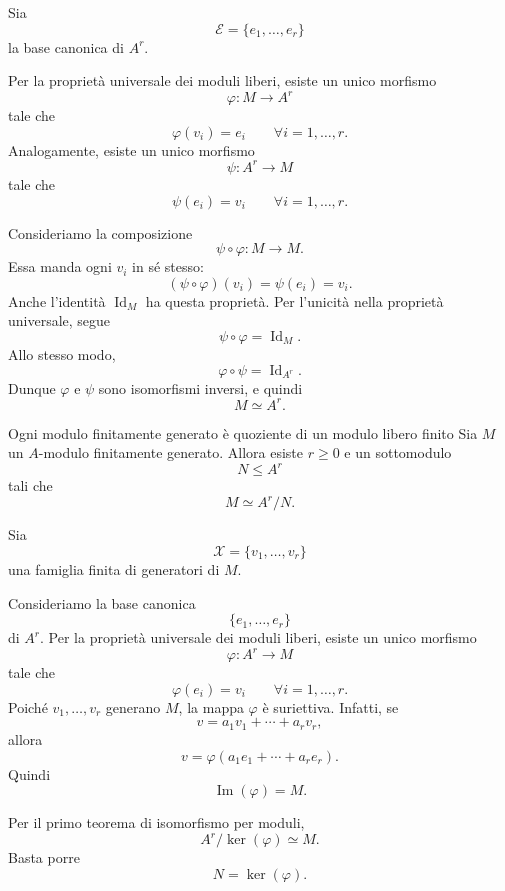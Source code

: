 \documentclass[a4paper]{article}
\begin{document}
\begin{radioactive}
\begin{snippetproof}{}
    Sia
    \[
        \mathcal{E}=\{e_1,\ldots,e_r\}
    \]
    la base canonica di \(A^r\).

    Per la proprietà universale dei moduli liberi, esiste un unico morfismo
    \[
        \varphi\colon M\to A^r
    \]
    tale che
    \[
        \varphi(v_i)=e_i
        \qquad
        \forall i=1,\ldots,r.
    \]
    Analogamente, esiste un unico morfismo
    \[
        \psi\colon A^r\to M
    \]
    tale che
    \[
        \psi(e_i)=v_i
        \qquad
        \forall i=1,\ldots,r.
    \]

    Consideriamo la composizione
    \[
        \psi\circ\varphi\colon M\to M.
    \]
    Essa manda ogni \(v_i\) in sé stesso:
    \[
        (\psi\circ\varphi)(v_i)=\psi(e_i)=v_i.
    \]
    Anche l'identità \(\operatorname{Id}_M\) ha questa proprietà. Per l'unicità nella proprietà universale, segue
    \[
        \psi\circ\varphi=\operatorname{Id}_M.
    \]
    Allo stesso modo,
    \[
        \varphi\circ\psi=\operatorname{Id}_{A^r}.
    \]
    Dunque \(\varphi\) e \(\psi\) sono isomorfismi inversi, e quindi
    \[
        M\simeq A^r.
    \]
\end{snippetproof}
\end{radioactive}

\begin{radioactive}
\begin{snippetcorollary}{Ogni modulo finitamente generato è quoziente di un modulo libero finito}
    Sia \(M\) un \(A\)-modulo finitamente generato. Allora esiste \(r\geq 0\) e un sottomodulo
    \[
        N\leq A^r
    \]
    tali che
    \[
        M\simeq A^r/N.
    \]
\end{snippetcorollary}
\end{radioactive}

\begin{radioactive}
\begin{snippetproof}{}
    Sia
    \[
        \mathcal{X}=\{v_1,\ldots,v_r\}
    \]
    una famiglia finita di generatori di \(M\).

    Consideriamo la base canonica
    \[
        \{e_1,\ldots,e_r\}
    \]
    di \(A^r\). Per la proprietà universale dei moduli liberi, esiste un unico morfismo
    \[
        \varphi\colon A^r\to M
    \]
    tale che
    \[
        \varphi(e_i)=v_i
        \qquad
        \forall i=1,\ldots,r.
    \]
    Poiché \(v_1,\ldots,v_r\) generano \(M\), la mappa \(\varphi\) è suriettiva. Infatti, se
    \[
        v=a_1v_1+\cdots+a_rv_r,
    \]
    allora
    \[
        v=
        \varphi(a_1e_1+\cdots+a_re_r).
    \]
    Quindi
    \[
        \operatorname{Im}(\varphi)=M.
    \]

    Per il primo teorema di isomorfismo per moduli,
    \[
        A^r/\ker(\varphi)\simeq M.
    \]
    Basta porre
    \[
        N=\ker(\varphi).
    \]
\end{snippetproof}
\end{radioactive}
\end{document}
